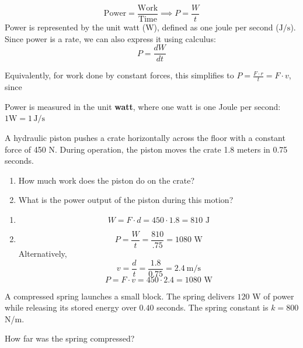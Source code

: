 \begin{mdframed}[style=important, frametitle={Formula for Power}]
	\[\text{Power} = \frac{\text{Work}}{\text{Time}} \implies P = \frac{W}{t}\]
  Power is represented by the unit watt ($\text{W}$), defined as one joule per second ($\text{J/s}$).
	Since power is a rate, we can also express it using calculus:
	\[P=\frac{dW}{dt}\]

	Equivalently, for work done by constant forces, this simplifies to $P=\frac{F \cdot r}{t} = F \cdot v$, since 
\end{mdframed}

Power is measured in the unit \textbf{watt}, where one watt is one Joule per second: $1 \text{W} = 1 \, \text{J}/\text{s}$

\begin{Exercise}[title=Hydraulic Piston Problem,label=power1]
A hydraulic piston pushes a crate horizontally across the floor with a constant force of 450 N.
During operation, the piston moves the crate 1.8 meters in 0.75 seconds.

\begin{enumerate}[label=(\alph*)]
  \item How much work does the piston do on the crate?
  \item What is the power output of the piston during this motion?
\end{enumerate}
\end{Exercise}
\begin{Answer}[ref=power1]
\begin{enumerate}[label=(\alph*)]
  \item $$W = F\cdot d = 450 \cdot  1.8 =810 \text{ J}$$
  \item $$P = \frac{W}{t} = \frac{810}{.75} = 1080 \text{ W}$$
  Alternatively,
  $$v = \frac{d}{t} = \frac{1.8}{0.75} = 2.4\ \text{m/s}$$
  $$P = F\cdot v = 450 \cdot 2.4 = 1080 \text{ W}$$
\end{enumerate}
\end{Answer}

\begin{Exercise}[title=Spring Power, label=power2]
A compressed spring launches a small block. The spring delivers $120$ W of power while releasing its stored energy over $0.40$ seconds. The spring constant is $k = 800$ N/m.

How far was the spring compressed?
\end{Exercise}

